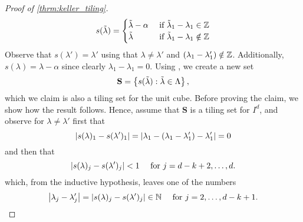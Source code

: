 \documentclass[../thesis.tex]{subfiles}
\begin{document}
\begin{proof}[Proof of \cref{thrm:keller_tiling}]
    \begin{equation}\label{eq:s_function}
        s(\tilde{\lambda}) = 
        \begin{cases}
            \tilde{\lambda} - \alpha & \text{ if } \tilde{\lambda}_1-\lambda_1 \in \mathbb{Z}\\
            \tilde{\lambda} & \text{ if } \tilde{\lambda}_1-\lambda_1 \notin \mathbb{Z}\\
        \end{cases}
    \end{equation}
    Observe that $s(\lambda')=\lambda'$ using that  $\lambda \neq \lambda'$ and $(\lambda_{1}-\lambda_{1}') \notin \mathbb{Z}$. Additionally, $s(\lambda)=\lambda-\alpha$ since clearly $\lambda_{1}-\lambda_{1} = 0$. Using , we create a new set 
    \begin{equation*}
        \mathbf{S} = \left\{s(\tilde{\lambda}) :\tilde{\lambda} \in  \Lambda \right\},
    \end{equation*}
    which we claim is also a tiling set for the unit cube. Before proving the claim, we show how the result follows. Hence, assume that $\mathbf{S}$ is a tiling set for $I^d$, and observe for $\lambda\neq \lambda'$ first that 
    \begin{equation*}
        \left| s(\lambda)_1 - s(\lambda')_1\right| = \left|\lambda_1 - \left(\lambda_1-\lambda_1'\right) - \lambda_1'\right| = 0
    \end{equation*}
    and then that
    \begin{equation*}
        \left| s(\lambda)_j - s(\lambda')_j\right| < 1 \quad \text{ for } j= d-k+2,\dots,d.
    \end{equation*}
    which, from the inductive hypothesis, leaves one of the numbers 
    \begin{equation*}
        \left|\lambda_j - \lambda_j'\right| = \left|s(\lambda)_j - s(\lambda')_j\right| \in \mathbb{N} \quad \text{ for } j = 2,\dots, d-k+1.
    \end{equation*}


\end{proof}
\end{document}
